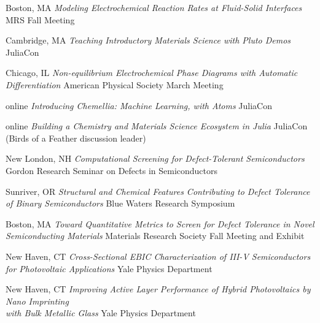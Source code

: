 {Boston, MA}
{\textit{Modeling Electrochemical Reaction Rates at Fluid-Solid Interfaces}}
{MRS Fall Meeting}

\vspace{-2mm}
\datedsubsection{}
        {Cambridge, MA}
        {\textit{Teaching Introductory Materials Science with Pluto Demos}}
        {JuliaCon}

\vspace{-2mm}
	{Chicago, IL}
	{\textit{Non-equilibrium Electrochemical Phase Diagrams with Automatic Differentiation}}
    {American Physical Society March Meeting}

\vspace{-2mm}
	{online}
	{\textit{Introducing Chemellia: Machine Learning, with Atoms}}
    {JuliaCon}

\vspace{-3mm}
\datedsubsection{}
	{online}
	{\textit{Building a Chemistry and Materials Science Ecosystem in Julia}}
    {JuliaCon (Birds of a Feather discussion leader)}

\vspace{-2mm}
	{New London, NH}
	{\textit{Computational Screening for Defect-Tolerant Semiconductors}}
    {Gordon Research Seminar on Defects in Semiconductors}

\vspace{-3mm}
\datedsubsection{}
	{Sunriver, OR}
	{\textit{Structural and Chemical Features Contributing to Defect Tolerance of Binary Semiconductors}}
    {Blue Waters Research Symposium}

\vspace{-2mm}
    {Boston, MA}
    {\textit{Toward Quantitative Metrics to Screen for Defect Tolerance in Novel Semiconducting Materials}}
    {Materials Research Society Fall Meeting and Exhibit}

\vspace{-2mm}
    {New Haven, CT}
    {\textit{Cross-Sectional EBIC Characterization of III-V Semiconductors for Photovoltaic Applications}}
    {Yale Physics Department}

\vspace{-2mm}
    {New Haven, CT}
    {\textit{Improving Active Layer Performance of Hybrid Photovoltaics by Nano Imprinting\\ with Bulk Metallic Glass}}
    {Yale Physics Department}
